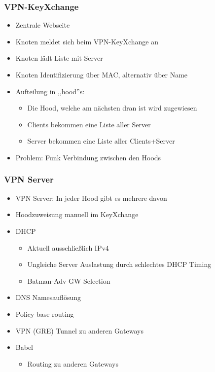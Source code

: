 \begin{frame}
\frametitle{VPN-KeyXchange}
    \begin{itemize}
        \item Zentrale Webseite
        \item Knoten meldet sich beim VPN-KeyXchange an
        \item Knoten lädt Liste mit Server
        \item Knoten Identifizierung über MAC, alternativ über Name
        \item<2> Aufteilung in ,,hood''s:
        \begin{itemize}
            \item Die Hood, welche am nächsten dran ist wird zugewiesen
            \item Clients bekommen eine Liste aller Server
            \item Server bekommen eine Liste aller Clients+Server
        \end{itemize}
        \item<2> Problem: Funk Verbindung zwischen den Hoods
    \end{itemize}
\end{frame}

\begin{frame}
\frametitle{VPN Server}
    \begin{itemize}
        \item VPN Server: In jeder Hood gibt es mehrere davon
        \item Hoodzuweisung manuell im KeyXchange
        \item DHCP
        \begin{itemize}
            \item Aktuell ausschließlich IPv4
            \item Ungleiche Server Auslastung durch schlechtes DHCP Timing
            \item Batman-Adv GW Selection
        \end{itemize}
        \item DNS Namesauflösung
        \item Policy base routing
        \item VPN (GRE) Tunnel zu anderen Gateways
        \item Babel
        \begin{itemize}
            \item Routing zu anderen Gateways
        \end{itemize}
    \end{itemize}
\end{frame}

